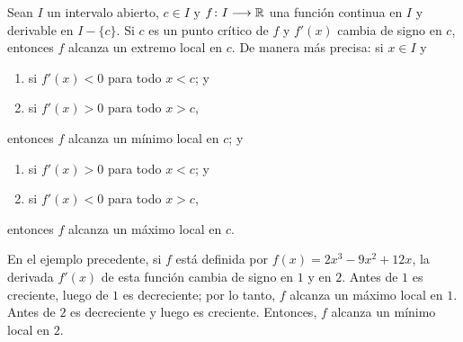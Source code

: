\begin{corocal}
Sean $I$ un intervalo abierto, $c \in I$ y $f\colon I\longrightarrow \mathbb{R}$ una función continua en $I$ y
derivable en $I - \{c\}$. Si $c$ es un punto crítico de $f$ y $f'(x)$ cambia de signo en $c$,
entonces $f$ alcanza un extremo local en $c$. De manera más precisa: si $x\in I$ y
\begin{enumerate}
\item si $f'(x) < 0$ para todo $x < c$; y
\item si $f'(x) > 0$ para todo $x > c$,
\end{enumerate}
entonces $f$ alcanza un mínimo local en $c$; y
\begin{enumerate}
\item si $f'(x) > 0$ para todo $x < c$; y
\item si $f'(x) < 0$ para todo $x > c$,
\end{enumerate}
entonces $f$ alcanza un máximo local en $c$.
\end{corocal}

\begin{exemplo}[]{}
En el ejemplo precedente, si $f$ está definida por $f(x) = 2x^3 - 9x^2 + 12x$, la derivada $f'(x)$
de esta función cambia de signo en $1$ y en $2$. Antes de $1$ es creciente, luego de $1$ es
decreciente; por lo tanto, $f$ alcanza un máximo local en $1$. Antes de $2$ es decreciente y luego
es creciente. Entonces, $f$ alcanza un mínimo local en $2$.
\end{exemplo}


